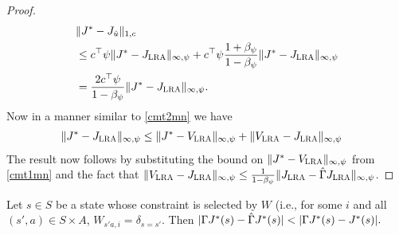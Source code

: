 \begin{proof}
\begin{align}
&\|J^*-J_{\hat{u}}\|_{1,c}\nonumber\\
&\leq c^\top \psi \|J^*-J_{\text{\sc LRA}}\|_{\infty,\psi}+c^\top \psi\frac{1+\beta_\psi}{1-\beta_\psi}\|J^*- J_{\text{\sc LRA}}\|_{\infty,\psi}\nonumber\\
&=\frac{2c^\top \psi}{1-\beta_{\psi}}\|J^*- J_{\text{\sc LRA}}\|_{\infty,\psi}.
\end{align}
Now in a manner similar to \cref{cmt2mn} we have
\begin{align}
\|J^*- J_{\text{\sc LRA}}\|_{\infty,\psi}&\leq \|J^*- V_{\text{\sc LRA}}\|_{\infty,\psi}+\|V_{\text{\sc LRA}} -J_{\text{\sc LRA}}\|_{\infty,\psi}\nonumber
\end{align}
The result now follows by substituting the bound on $\|J^*- V_{\text{\sc LRA}}\|_{\infty,\psi}$ from \cref{cmt1mn} and the fact that $\|V_{\text{\sc LRA}}-J_{\text{\sc LRA}}\|_{\infty,\psi}\leq \frac{1}{1-\beta_{\psi}}\|J_{\text{\sc LRA}}-\hat{\Gamma}J_{\text{\sc LRA}}\|_{\infty,\psi}$.
\end{proof}
\begin{comment}
\begin{note}
By bounding $\etmn=\norm{\Gamma J^*-J^*+J^*-\hg J^*}_{\mn}\leq 2\norm{J^*-\Phi r^*}_{\mn}+\norm{J^*-\hg J^*}_{\mn}$
(the inequality follows from \cref{bestbndmn}), 
we can loosen the bounds in \cref{cmt2mn} and \cref{polthe} to
\begin{align}
\label{loose1}
\norm{J^*-\hj}_{1,c}&\leq\frac{c^\top\psi}{1-\beta_\psi}(10 \norm{J^*-\Phi r^*}_{\mn}
\nn\\&
+2\norm{J^*-\hg J^*}_{\mn}).\\
\label{loose2}
\norm{J^* - J_{\hu}}_{1,c}&\leq 2\left(\frac{c^\top \psi}{1-\beta_{\psi}}\right)^2 \,\big(10 \norm{J^*-\Phi r^*}_{\mn}
\nn\\&
+2\norm{J^*-\hg J^*}_{\mn}\big).
\end{align}
Here the term $||J^*-\hg J^*||$ in \eqref{loose1} and \eqref{loose2} captures the error due to the use of both $\Phi$ and $W$. Though, \eqref{loose1} and \eqref{loose2} might be loser bounds than \eqref{finalbndmn} and \eqref{polthebnd} respectively, the advantage of this bound is that it captures the error due to function approximation as well as constraint reduction in a direct manner.
\end{note}
\end{comment}
\begin{theorem}
Let $s\in S$ be a state whose constraint is selected by $W$ (i.e., for some $i$ and all $(s',a)\in S\times A$,
$W_{s'a,i}=\delta_{s=s'}$.
Then
$
|\Gamma J^*(s)-\hg J^*(s)|<|\Gamma J^*(s)-J^*(s)|.
$
\end{theorem}

